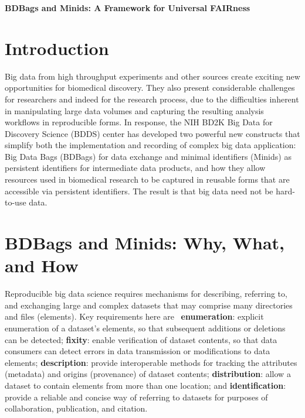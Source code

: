 \documentclass[11pt]{article}
\begin{document}
\noindent \textbf{ \Large BDBags and Minids: A Framework for Universal FAIRness }\\


\section{Introduction}

Big data from high throughput experiments and other sources create exciting new opportunities for biomedical discovery. 
They also present considerable challenges for researchers and indeed for the research process, 
due to the difficulties inherent in manipulating large data volumes and capturing the resulting analysis workflows in reproducible forms.  
In response, the NIH BD2K Big Data for Discovery Science (BDDS) center 
has developed two powerful new constructs that simplify both the implementation and recording of 
complex big data application: Big Data Bags (BDBags) for data exchange and 
minimal identifiers (Minids) as persistent identifiers for intermediate data products,
and how they allow resources used in biomedical research to be captured in reusable forms that are accessible via persistent identifiers. 
The result is that big data need not be hard-to-use data. 

\section{BDBags and Minids: Why, What, and How}

Reproducible big data science requires mechanisms for describing, referring to, and exchanging large  and complex datasets that may comprise many directories and files (elements).
Key requirements here are~\cite{chard16} 
\textbf{enumeration}: explicit enumeration of a dataset's elements, so that
subsequent additions or deletions can be detected; 
\textbf{fixity}: enable verification of dataset contents, so that data consumers can detect errors in data transmission or modifications to data elements; 
\textbf{description}: provide interoperable methods for tracking the attributes (metadata) and origins (provenance) of dataset contents; 
\textbf{distribution}: allow a dataset to contain elements from more than one location; and
\textbf{identification}: provide a reliable and concise way of referring to datasets for purposes of collaboration, publication, and citation.
\end{document}
